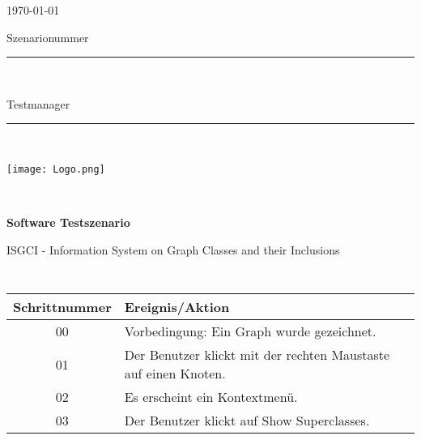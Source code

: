 


\thispagestyle{empty} %


\begin{minipage}[l]{0.6\textwidth}
{\large \today}\\

{\large Szenarionummer \rule{1cm}{0.4pt}}\\

{\large Testmanager \rule{4cm}{0.4pt}}\\

\end{minipage}
\begin{minipage}{0.4\textwidth}
\texttt{[image: Logo.png]}
\end{minipage}\\


\vspace*{1cm} 
\begin{center}
\textbf{{\LARGE Software Testszenario}}\\
\end{center}

\begin{center}
{\large ISGCI - Information System on Graph Classes and their Inclusions}\\
\end{center}


$ $\\


	$ $\\

\begin{tabular}{|c|l|}
\hline
\rule{0.00\textwidth}{0.5cm} \textbf{Schrittnummer} & \textbf{Ereignis/Aktion} \hspace{0.55\textwidth} \\[0.25cm]
\hline 
\rule{0.00\textwidth}{0.5cm} 00 & Vorbedingung: Ein Graph wurde gezeichnet. \\[0.25cm]
\hline
 \rule{0.00\textwidth}{0.5cm} 01 & Der Benutzer klickt mit der rechten Maustaste auf einen Knoten. \\[0.25cm]
\hline 
 \rule{0.00\textwidth}{0.5cm} 02 & Es erscheint ein Kontextmenü. \\[0.25cm]
\hline 
 \rule{0.00\textwidth}{0.5cm} 03 & Der Benutzer klickt auf Show Superclasses. \\[0.25cm]
\hline
\end{tabular} \ \\

